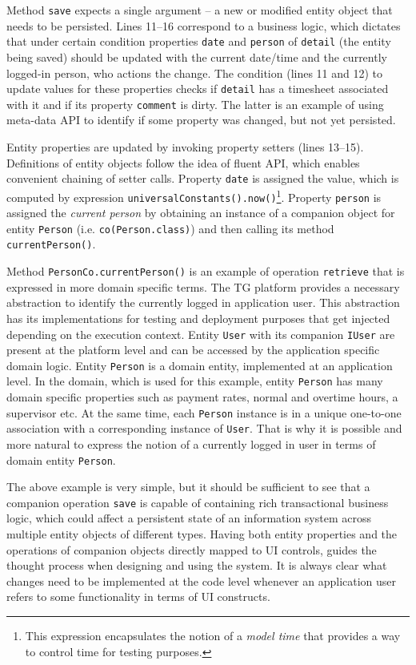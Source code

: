\documentclass[a4paper,12pt,oneside,openright,final]{memoir} %
\begin{document}
	Method \texttt{save} expects a single argument -- a new or modified entity object that needs to be persisted.
	Lines 11--16 correspond to a business logic, which dictates that under certain condition properties \texttt{date} and \texttt{person} of \texttt{detail} (the entity being saved) should be updated with the current date/time and the currently logged-in person, who actions the change.
	The condition (lines 11 and 12) to update values for these properties checks if \texttt{detail} has a timesheet associated with it and if its property \texttt{comment} is dirty.
	The latter is an example of using meta-data API to identify if some property was changed, but not yet persisted.

	Entity properties are updated by invoking property setters (lines 13--15).
	Definitions of entity objects follow the idea of fluent API, which enables convenient chaining of setter calls.
	Property \texttt{date} is assigned the value, which is computed by expression \texttt{universalConstants().now()}\footnote{This expression encapsulates the notion of a \emph{model time} that provides a way to control time for testing purposes.}.
	Property \texttt{person} is assigned the \emph{current person} by obtaining an instance of a companion object for entity \texttt{Person} (i.e. \texttt{co(Person.class)}) and then calling its method \texttt{currentPerson()}.
	
	Method \texttt{PersonCo.currentPerson()} is an example of operation \texttt{retrieve} that is expressed in more domain specific terms.
	The TG platform provides a necessary abstraction to identify the currently logged in application user.
	This abstraction has its implementations for testing and deployment purposes that get injected depending on the execution context.
	Entity \texttt{User} with its companion \texttt{IUser} are present at the platform level and can be accessed by the application specific domain logic.
	Entity \texttt{Person} is a domain entity, implemented at an application level.
	In the domain, which is used for this example, entity \texttt{Person} has many domain specific properties such as payment rates, normal and overtime hours, a supervisor etc.
	At the same time, each \texttt{Person} instance is in a unique one-to-one association with a corresponding instance of \texttt{User}.
	That is why it is possible and more natural to express the notion of a currently logged in user in terms of domain entity \texttt{Person}.
	
	The above example is very simple, but it should be sufficient to see that a companion operation \texttt{save} is capable of containing rich transactional business logic, which could affect a persistent state of an information system across multiple entity objects of different types.
	Having both entity properties and the operations of companion objects directly mapped to UI controls, guides the thought process when designing and using the system.
	It is always clear what changes need to be implemented at the code level whenever an application user refers to some functionality in terms of UI constructs.
	
\end{document}
